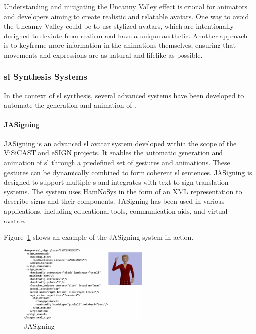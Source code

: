 \documentclass[../../main.tex]{subfiles}
\begin{document}
Understanding and mitigating the Uncanny Valley effect is crucial for animators and developers aiming to create realistic and relatable avatars. One way to avoid the Uncanny Valley could be to use stylized avatars, which are intentionally designed to deviate from realism and have a unique aesthetic. Another approach is to keyframe more information in the animations themselves, ensuring that movements and expressions are as natural and lifelike as possible.

\subsubsection{\gls{sl} Synthesis Systems}
\label{ch:background_work:sign_language_synthesis:3d_techniques:sign_language_synthesis_systems}

In the context of \gls{sl} synthesis, several advanced systems have been developed to automate the generation and animation of .

\paragraph{JASigning}
\label{ch:background_work:sign_language_synthesis:3d_techniques:sign_language_synthesis_systems:jasigning}

JASigning is an advanced \gls{sl} avatar system developed within the scope of the ViSiCAST and eSIGN projects. It enables the automatic generation and animation of \gls{sl} through a predefined set of gestures and animations. These gestures can be dynamically combined to form coherent \gls{sl} sentences. JASigning is designed to support multiple s and integrates with text-to-sign translation systems. The system uses HamNoSys in the form of an XML representation to describe signs and their components. JASigning has been used in various applications, including educational tools, communication aids, and virtual avatars.

Figure~\ref{fig:jasigning} shows an example of the JASigning system in action.

\begin{figure} 
  \centering \includegraphics[width = 2.5in]{chapters/background_work/images/jasigning.png} 
  \caption{JASigning} 
  \label{fig:jasigning} 
\end{figure}
\end{document}
